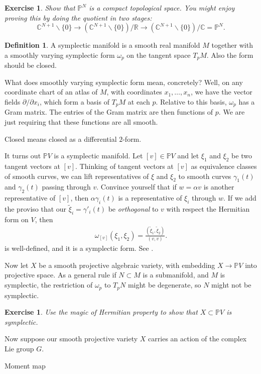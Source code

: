 \documentclass[12pt]{article}
\theoremstyle{plain}
\newtheorem{exer}[thm]{Exercise}
\theoremstyle{definition}
\newtheorem{defn}{Definition}[section]
\numberwithin{equation}{section}
\newcommand{\wtil}[1]{\widetilde{#1}}
\newcommand{\C}{\mathbb{C}}
\newcommand{\R}{\mathbb{R}}
\newcommand{\bbP}{\mathbb{P}}
\begin{document}
{\begin{exer}
Show that $\bbP^N$ is a compact topological space. You might enjoy proving this by doing the quotient in two stages:
\[
\C^{N+1} \backslash \{0\} \rightarrow (\C^{N+1} \backslash \{0\}) / \R \rightarrow (\C^{N+1} \backslash \{0\}) / \C = \bbP^N.
\]
\end{exer}

\begin{defn}
A symplectic manifold is a smooth real manifold $M$ together with a smoothly varying symplectic form $\omega_p$ on the tangent space $T_pM$. Also the form should be closed.
\end{defn}
What does smoothly varying symplectic form mean, concretely? Well, on any coordinate chart of an atlas of $M$, with coordinates $x_1, \ldots, x_n$, we have the vector fields $\partial/\partial x_i$, which form a basis of $T_pM$ at each $p$. Relative to this basis, $\omega_p$ has a Gram matrix. The entries of the Gram matrix are then functions of $p$. We are just requiring that these functions are all smooth.

Closed means closed as a differential $2$-form.

It turns out $\bbP V$ is a symplectic manifold. Let $[v] \in \bbP V$ and let $\xi_1$ and $\xi_2$ be two tangent vectors at $[v]$. Thinking of tangent vectors at $[v]$ as equivalence classes of smooth curves, we can lift representatives of $\xi$ and $\xi_2$ to smooth curves $\gamma_1(t)$ and $\gamma_2(t)$ passing through $v$. Convince yourself that if $w = \alpha v$ is another representative of $[v]$, then $\alpha \gamma_i(t)$ is a representative of $\xi_i$ through $w$. If we add the proviso that our $\wtil{\xi}_i = \gamma'_i(t)$ be \emph{orthogonal} to $v$ with respect the Hermitian form on $V$, then
\begin{align*}
\omega_{[v]}(\xi_1, \xi_2) = \frac{(\wtil{\xi}_1, \wtil{\xi}_2)}{(v, v)}.
\end{align*}
is well-defined, and it is a symplectic form. See \cite{Woodward}.

Now let $X$ be a smooth projective algebraic variety, with embedding $X \rightarrow \bbP V$ into projective space. As a general rule if $N \subset M$ is a submanifold, and $M$ is symplectic, the restriction of $\omega_p$ to $T_pN$ might be degenerate, so $N$ might not be symplectic.
\begin{exer}
Use the magic of Hermitian property to show that $X \subset \bbP V$ is symplectic.
\end{exer}

Now suppose our smooth projective variety $X$ carries an action of the complex Lie group $G$.

Moment map

}





{}

\end{document}
